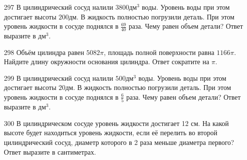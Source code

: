\documentclass[4apaper]{article}
\begin{document}
\begin{taskBN}{297}
В цилиндрический сосуд налили $3800\mbox{дм}^3$ воды. Уровень воды при этом достигает высоты $200$дм. В жидкость полностью погрузили деталь. При этом уровень жидкости в сосуде поднялся в $\frac{69}{40}$ раза. Чему равен объем детали? Ответ выразите в $\mbox{дм}^3$.
\end{taskBN}

\begin{taskBN}{298}
Объём цилиндра равен $5082\pi$, площадь полной поверхности равна $1166\pi$. Найдите длину окружности основания цилиндра. Ответ сократите на $\pi$.
\end{taskBN}

\begin{taskBN}{299}
В цилиндрический сосуд налили $500\mbox{дм}^3$ воды. Уровень воды при этом достигает высоты $20$дм. В жидкость полностью погрузили деталь. При этом уровень жидкости в сосуде поднялся в $\frac{6}{5}$ раза. Чему равен объем детали? Ответ выразите в $\mbox{дм}^3$.
\end{taskBN}

\begin{taskBN}{300}
В цилиндрическом сосуде уровень жидкости достигает 12 см. На какой высоте будет находиться уровень жидкости, если её перелить во второй цилиндрический сосуд, диаметр которого в 2 раза меньше диаметра первого? Ответ выразите в сантиметрах.
\end{taskBN}
\end{document}
